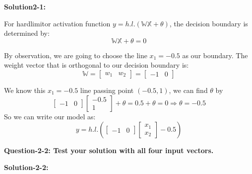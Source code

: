\documentclass[12pt,letterpaper]{article}
\theoremstyle{definition}
\begin{document}

\textbf{Solution2-1:}

For hardlimitor activation function $y=h.l.(\mathbb{W}\mathbb{X}+\theta)$, the decision boundary is determined by:
\begin{equation}
    \mathbb{W}\mathbb{X} + \theta  = 0\label{eq2-1-1}
\end{equation}

By observation, we are going to choose the line $x_1=-0.5$ as our boundary. The weight vector that is orthogonal to our decision boundary is:
\[\mathbb{W} = \left[ {\begin{array}{*{20}{c}}
{{w_1}}&{{w_2}}
\end{array}} \right] = \left[ {\begin{array}{*{20}{c}}
-1&0
\end{array}} \right]\]


We know this $x_1=-0.5$ line passing point $(-0.5, 1)$, we can find $\theta$ by
\[\left[ {\begin{array}{*{20}{c}}
-1&0
\end{array}} \right]\left[ {\begin{array}{*{20}{c}}
{ - 0.5}\\
1
\end{array}} \right] + \theta  =  0.5  + \theta  = 0 \Rightarrow \theta  = -0.5\]
So we can write our model as:
\begin{equation}
    \boxed{y = h.l.\left( {\left[ {\begin{array}{*{20}{c}}
-1&0
\end{array}} \right]\left[ {\begin{array}{*{20}{c}}
{{x_1}}\\
{{x_2}}
\end{array}} \right] - 0.5} \right)}
\end{equation}

\textbf{Question-2-2: Test your solution with all four input vectors.}

\textbf{Solution-2-2:}
\end{document}
